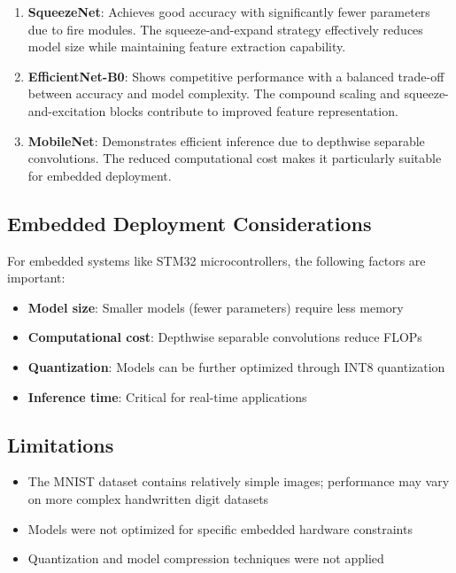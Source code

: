 \documentclass[12pt,a4paper]{article}
\begin{document}
\begin{enumerate}
    \item \textbf{SqueezeNet}: Achieves good accuracy with significantly fewer parameters due to fire modules. The squeeze-and-expand strategy effectively reduces model size while maintaining feature extraction capability.
    
    \item \textbf{EfficientNet-B0}: Shows competitive performance with a balanced trade-off between accuracy and model complexity. The compound scaling and squeeze-and-excitation blocks contribute to improved feature representation.
    
    \item \textbf{MobileNet}: Demonstrates efficient inference due to depthwise separable convolutions. The reduced computational cost makes it particularly suitable for embedded deployment.
\end{enumerate}

\subsection{Embedded Deployment Considerations}

For embedded systems like STM32 microcontrollers, the following factors are important:

\begin{itemize}
    \item \textbf{Model size}: Smaller models (fewer parameters) require less memory
    \item \textbf{Computational cost}: Depthwise separable convolutions reduce FLOPs
    \item \textbf{Quantization}: Models can be further optimized through INT8 quantization
    \item \textbf{Inference time}: Critical for real-time applications
\end{itemize}

\subsection{Limitations}

\begin{itemize}
    \item The MNIST dataset contains relatively simple images; performance may vary on more complex handwritten digit datasets
    \item Models were not optimized for specific embedded hardware constraints
    \item Quantization and model compression techniques were not applied
\end{itemize}
\end{document}
